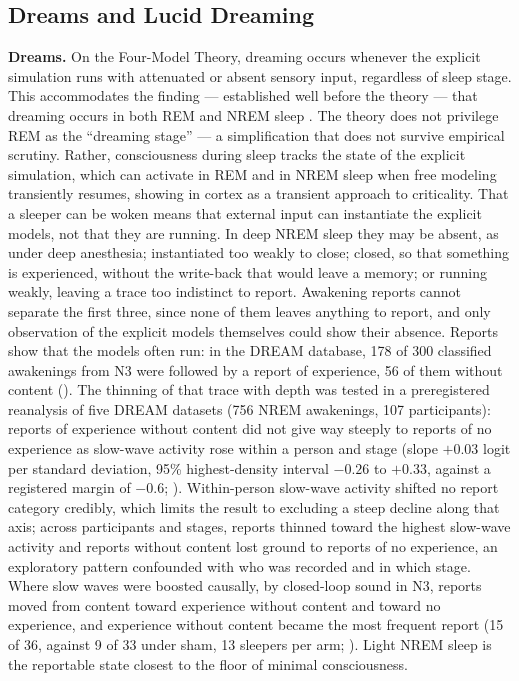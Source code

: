 \documentclass[12pt]{article}
\newcommand{\revstart}{}
\begin{document}
{\revstart\subsection{Dreams and Lucid Dreaming}


\textbf{Dreams.} On the Four-Model Theory, dreaming occurs whenever the explicit simulation runs with attenuated or absent sensory input, regardless of sleep stage. This accommodates the finding — established well before the theory — that dreaming occurs in both REM and NREM sleep \citep{Noreika2009,Siclari2017,Siclari2018,NirTononi2010}. The theory does not privilege REM as the ``dreaming stage'' --- a simplification that does not survive empirical scrutiny. Rather, consciousness during sleep tracks the state of the explicit simulation, which can activate in REM and in NREM sleep when free modeling transiently resumes, showing in cortex as a transient approach to criticality. That a sleeper can be woken means that external input can instantiate the explicit models, not that they are running. In deep NREM sleep they may be absent, as under deep anesthesia; instantiated too weakly to close; closed, so that something is experienced, without the write-back that would leave a memory; or running weakly, leaving a trace too indistinct to report. Awakening reports cannot separate the first three, since none of them leaves anything to report, and only observation of the explicit models themselves could show their absence. Reports show that the models often run: in the DREAM database, 178 of 300 classified awakenings from N3 were followed by a report of experience, 56 of them without content (\citealp{Wong2025}). The thinning of that trace with depth was tested in a preregistered reanalysis of five DREAM datasets (756 NREM awakenings, 107 participants): reports of experience without content did not give way steeply to reports of no experience as slow-wave activity rose within a person and stage (slope $+0.03$ logit per standard deviation, 95\% highest-density interval $-0.26$ to $+0.33$, against a registered margin of $-0.6$; \citealp{Gruber2026g}). Within-person slow-wave activity shifted no report category credibly, which limits the result to excluding a steep decline along that axis; across participants and stages, reports thinned toward the highest slow-wave activity and reports without content lost ground to reports of no experience, an exploratory pattern confounded with who was recorded and in which stage. Where slow waves were boosted causally, by closed-loop sound in N3, reports moved from content toward experience without content and toward no experience, and experience without content became the most frequent report (15 of 36, against 9 of 33 under sham, 13 sleepers per arm; \citealp{Juan2023}). Light NREM sleep is the reportable state closest to the floor of minimal consciousness.

}
\end{document}
